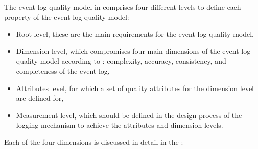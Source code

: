 The event log quality model in  comprises four different levels to define each property of the event log quality model:

\begin{itemize}
	\item Root level, these are the main requirements for the event log quality model,
	\item Dimension level, which compromises four main dimensions of the event log quality model according to \cite{Kherbouche2017}: complexity, accuracy, consistency, and completeness of the event log,
	\item Attributes level, for which a set of quality attributes for the dimension level are defined for,
	\item Measurement level, which should be defined in the design process of the logging mechanism to achieve the attributes and dimension levels.
\end{itemize}

\clearpage

Each of the four dimensions is discussed in detail in the :

